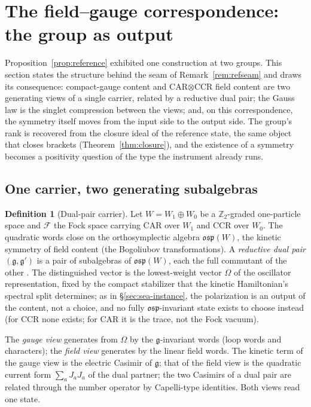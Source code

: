 \documentclass[11pt]{article}
\theoremstyle{definition}
\newtheorem{definition}[theorem]{Definition}
\theoremstyle{remark}
\newcommand{\g}{\mathfrak{g}}
\begin{document}
\section{The field--gauge correspondence: the group as output}
\label{sec:correspondence}

Proposition~\ref{prop:reference} exhibited one construction at two
groups.  This section states the structure behind the seam of
Remark~\ref{rem:refseam} and draws its consequence: compact-gauge
content and CAR$\otimes$CCR field content are two generating views of a
single carrier, related by a reductive dual pair; the Gauss law is the
singlet compression between the views; and, on this correspondence, the
symmetry itself moves from the input side to the output side.  The
group's rank is recovered from the closure ideal of the reference
state, the same object that closes brackets
(Theorem~\ref{thm:closure}), and the existence of a symmetry becomes a
positivity question of the type the instrument already runs.

\subsection{One carrier, two generating subalgebras}
\begin{definition}[Dual-pair carrier]\label{def:dualpaircarrier}
Let $W = W_1 \oplus W_0$ be a $\mathbb Z_2$-graded one-particle space
and $\mathcal F$ the Fock space carrying CAR over $W_1$ and CCR over
$W_0$.  The quadratic words close on the orthosymplectic algebra
$\mathfrak{osp}(W)$, the kinetic symmetry of field content (the
Bogoliubov transformations).  A \emph{reductive dual pair} $(\g, \g')$
is a pair of subalgebras of $\mathfrak{osp}(W)$, each the full
commutant of the other \cite{howe}.  The distinguished vector is the
lowest-weight vector $\Omega$ of the oscillator representation, fixed
by the compact stabilizer that the kinetic Hamiltonian's spectral split
determines; as in \S\ref{sec:sea-instance}, the polarization is an
output of the content, not a choice, and no fully
$\mathfrak{osp}$-invariant state exists to choose instead (for CCR none
exists; for CAR it is the trace, not the Fock vacuum).
\end{definition}

The \emph{gauge view} generates from $\Omega$ by the $\g$-invariant
words (loop words and characters); the \emph{field view} generates by
the linear field words.  The kinetic term of the gauge view is the
electric Casimir of $\g$; that of the field view is the quadratic
current form $\sum_a J_a J_a$ of the dual partner; the two Casimirs of
a dual pair are related through the number operator by Capelli-type
identities.  Both views read one state.
\end{document}
